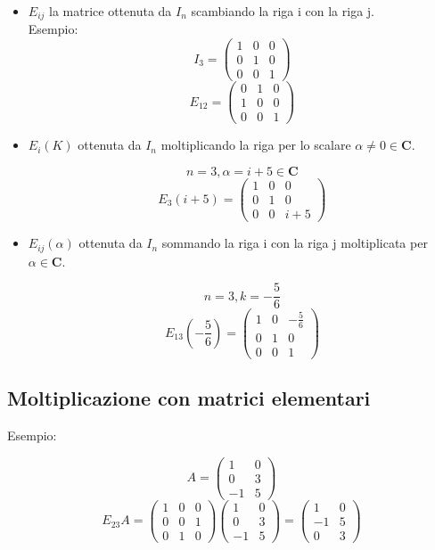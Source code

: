\documentclass[12pt]{article}
\begin{document}
\begin{itemize}

\item $E_{ij}$ la matrice ottenuta da $I_n$ scambiando la riga i con la riga j.
\\Esempio:
\[I_3 = \begin{pmatrix}
    1 & 0 & 0\\
    0 & 1 & 0\\
    0 & 0 & 1
\end{pmatrix}\]
\[E_{12} = \begin{pmatrix}
    0 & 1 & 0\\
    1 & 0 & 0\\
    0 & 0 & 1
\end{pmatrix}\]

\item $E_{i}(K)$ ottenuta da $I_n$ moltiplicando la riga per lo scalare $\alpha \neq 0 \in \mathbf{C}.$

\[n = 3, \alpha = i+5 \in \mathbf{C}\]
\[E_3(i+5) = \begin{pmatrix}
    1 & 0 & 0\\
    0 & 1 & 0\\
    0 & 0 & i+5
\end{pmatrix}\]

\item  $E_{ij}(\alpha)$ ottenuta da $I_n$ sommando la riga i con la riga j moltiplicata per $\alpha \in \mathbf{C}$.

\[n = 3, k = -\frac{5}{6}\]
\[E_{13}\left(-\frac{5}{6}\right) = \begin{pmatrix}
    1 & 0 & -\frac{5}{6}\\
    0 & 1 & 0\\
    0 & 0 & 1
\end{pmatrix}\]

\end{itemize}
\subsection{Moltiplicazione con matrici elementari}

Esempio:

\[A = \begin{pmatrix}
    1 & 0\\
    0 & 3\\
    -1 & 5
\end{pmatrix}\]
\[E_{23}A = \begin{pmatrix}
    1 & 0 & 0\\
    0 & 0 & 1\\
    0 & 1 & 0
\end{pmatrix}
\begin{pmatrix}
    1 & 0\\
    0 & 3\\
    -1 & 5
\end{pmatrix} =
\begin{pmatrix}
    1 & 0\\
    -1 & 5\\
    0 & 3
\end{pmatrix}
\]
\end{document}
